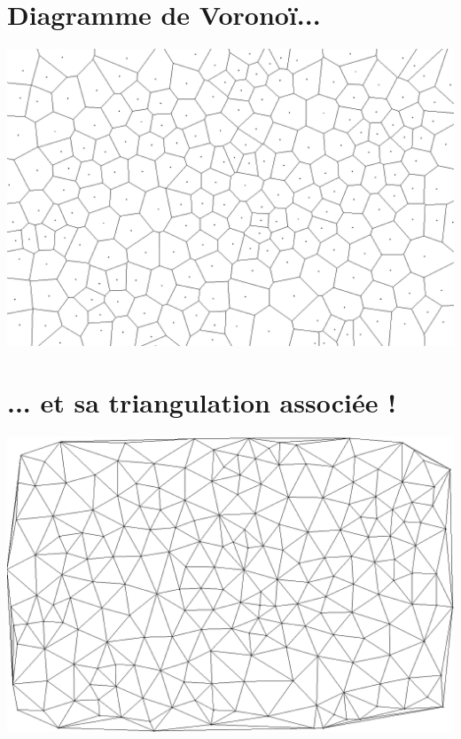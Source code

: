 \documentclass[a4paper, 10pt]{article}
\begin{document}
\begin{center}
\section*{Diagramme de Voronoï...}
\includegraphics[scale=0.4]{Diagramme200.PNG}
\bigbreak
\bigbreak
\bigbreak
\section*{... et sa triangulation associée !}
\includegraphics[scale=0.4]{DiagrammeDual200Modifie.PNG}
\end{center} 

\newpage
\end{document}
